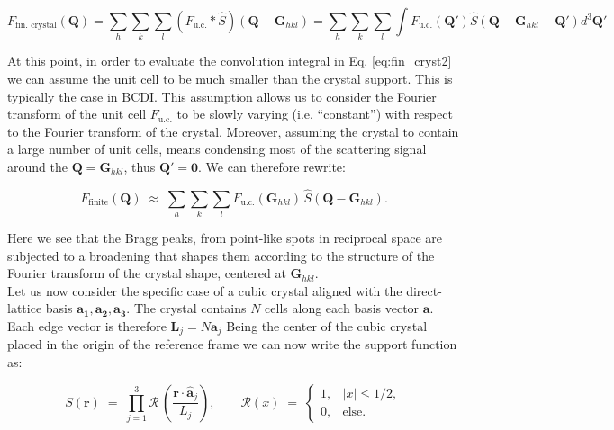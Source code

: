 \begin{equation}
    F_{\text{fin. crystal}}(\mathbf{Q}) = \sum_{h} \sum_{k} \sum_{l} (F_{\text{u.c.}}\ast \widehat S)
    (\mathbf{Q} - \mathbf{G}_{hkl}) = \sum_{h} \sum_{k} \sum_{l} \int F_{\text{u.c.}}(\mathbf{Q'})\widehat S
    (\mathbf{Q} - \mathbf{G}_{hkl} -\mathbf{Q'}) d^3\mathbf{Q'}
    \label{eq:fin_cryst2}
\end{equation}

At this point, in order to evaluate the convolution integral in Eq. \ref{eq:fin_cryst2} we can assume the unit cell 
to be much smaller than the crystal support. This is typically the case in BCDI. This assumption allows us to consider 
the Fourier transform of the unit cell $F_{\text{u.c.}}$ to be slowly varying (i.e. ``constant'') with respect to the 
Fourier transform of the crystal. Moreover, assuming the crystal to contain a large number of unit cells, means condensing 
most of the scattering signal around the $\mathbf Q = \mathbf{G}_{hkl}$, thus  $\mathbf {Q'} = \mathbf{0}$. We can therefore rewrite: 

\begin{equation}
    F_{\text{finite}}(\mathbf Q) \;\approx\; 
    \sum_{h} \sum_{k} \sum_{l} F_{\text{u.c.}}(\mathbf{G}_{hkl})\,
    \widehat S(\mathbf Q - \mathbf{G}_{hkl}).
    \label{eq:fin_cryst3}
\end{equation}

Here we see that the Bragg peaks, from point-like spots in reciprocal space are subjected to a broadening that shapes them 
according to the structure of the Fourier transform of the crystal shape, centered at $\mathbf{G}_{hkl}$. \\

Let us now consider the specific case of a cubic crystal aligned with the direct-lattice basis $\mathbf{a_1},\mathbf{a_2},\mathbf{a_3}$.
The crystal contains $N$ cells along each basis vector $\mathbf{a}$. Each edge vector is therefore $\mathbf{L}_j = N\mathbf{a}_j$ 
Being the center of the cubic crystal placed in the origin of the reference frame we can now write the support function as: 

\begin{equation}
    S(\mathbf r) \;=\; 
    \prod_{j=1}^{3} \mathcal R \,\!\left(\frac{\mathbf{r} \cdot \mathbf{\hat{a}}_j}{L_j}\right),
    \qquad
    \mathcal R(x) \;=\;
    \begin{cases}
    1, & |x| \le 1/2
    , \\[6pt]
    0, & \text{else}.
    \end{cases}
    \label{eq:cube}
\end{equation}

